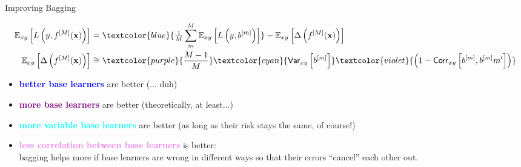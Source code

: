 \documentclass[11pt,compress,t,notes=noshow, xcolor=table]{beamer}
\begin{document}
\begin{vbframe}{Improving Bagging}
\begin{small}
\begin{align*}
\Exy\left[L\left(y, \fM\right)\right] &= \textcolor{blue}{\tfrac{1}{M}\sum^M_{m} \Exy\left[L\left(y, \bl \right)\right]} - \Exy\left[\ambifM\right]\\
\Exy\left[\ambifM\right] &\cong 
\textcolor{purple}{\frac{M-1}{M}} \textcolor{cyan}{\var_{xy}\left[\bl\right]} \textcolor{violet}{\left(1 - \corr_{xy}\left[\bl, \bl{m'}\right]\right)}
\end{align*}
\end{small}
\begin{itemize}
\item[$\Rightarrow$] \textcolor{blue}{\textbf{better base learners}} are better {\small (... duh)}
\item[$\Rightarrow$] \textcolor{purple}{\textbf{more base learners}} are better {\small (theoretically, at least...)}\\
\item[$\Rightarrow$] \textcolor{cyan}{\textbf{more variable base learners}} are better {\small(as long as their risk stays the same, of course!)}
\item[$\Rightarrow$] \textcolor{violet}{\textbf{less correlation between base learners}} is better:\\ bagging helps more if base learners are wrong in different ways so that their errors \enquote{cancel} each other out.\\
\end{itemize}


\end{vbframe}


\endlecture
\end{document}

